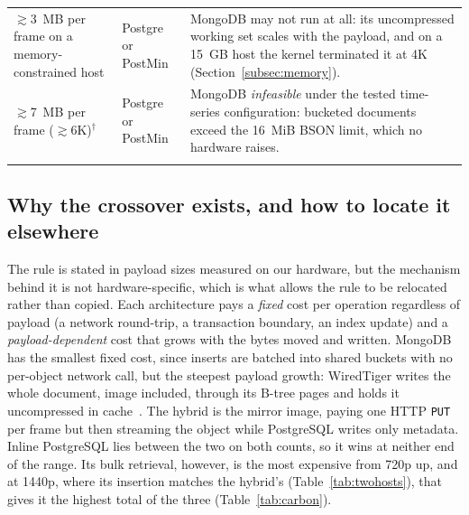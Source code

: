 \documentclass[pdflatex,sn-basic]{sn-jnl}%
\begin{document}
\begin{table}[htbp]
\begin{tabular}{@{}p{}p{}p{}@{}}
$\gtrsim$3~MB per frame on a memory-constrained host & Postgre or PostMin & MongoDB may not run at all: its uncompressed working set scales with the payload, and on a 15~GB host the kernel terminated it at 4K (Section~\ref{subsec:memory}). \\
$\gtrsim$7~MB per frame ($\gtrsim$6K)$^\dagger$ & Postgre or PostMin & MongoDB \emph{infeasible} under the tested time-series configuration: bucketed documents exceed the 16~MiB BSON limit, which no hardware raises. \\
\botrule
\end{tabular}
\end{table}

\subsection{Why the crossover exists, and how to locate it elsewhere}\label{subsec:model}
The rule is stated in payload sizes measured on our hardware, but the mechanism behind it is not hardware-specific, which is what allows the rule to be relocated rather than copied. Each architecture pays a \emph{fixed} cost per operation regardless of payload (a network round-trip, a transaction boundary, an index update) and a \emph{payload-dependent} cost that grows with the bytes moved and written. MongoDB has the smallest fixed cost, since inserts are batched into shared buckets with no per-object network call, but the steepest payload growth: WiredTiger writes the whole document, image included, through its B-tree pages and holds it uncompressed in cache~\citep{wiredtiger_btree_architecture}. The hybrid is the mirror image, paying one HTTP \texttt{PUT} per frame but then streaming the object while PostgreSQL writes only metadata. Inline PostgreSQL lies between the two on both counts, so it wins at neither end of the range. Its bulk retrieval, however, is the most expensive from 720p up, and at 1440p, where its insertion matches the hybrid's (Table~\ref{tab:twohosts}), that gives it the highest total of the three (Table~\ref{tab:carbon}).
\end{document}
